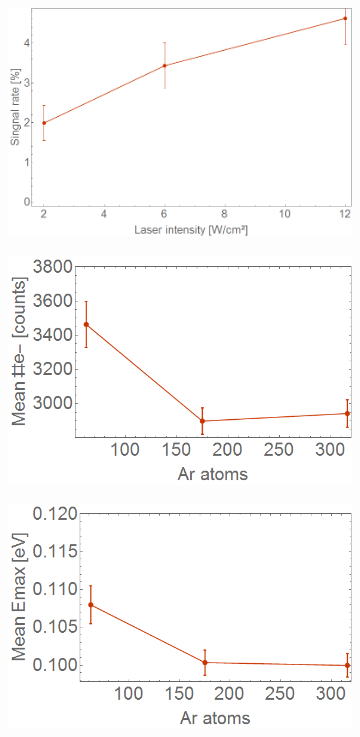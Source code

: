 \begin{figure}[h!]%
    \begin{subfigure}{0.3\textwidth}
\includegraphics[width=1\textwidth]{../Images/results/MIR_He_ArDop/signalrate.png}     
    \end{subfigure}

   \begin{subfigure}{0.34\textwidth}
\includegraphics[width=1\textwidth]{../Images/results/MIR_He_ArDop/Meanelect.png}     
    \end{subfigure}
 
    \begin{subfigure}{0.34\textwidth}
    \includegraphics[width=1\textwidth]{../Images/results/MIR_He_ArDop/Meaneneg.png} 
\end{subfigure}



\end{figure}
